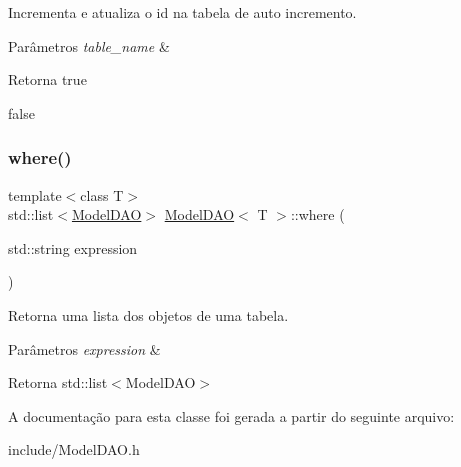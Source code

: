Incrementa e atualiza o id na tabela de auto incremento. 


\begin{DoxyParams}{Parâmetros}
{\em table\+\_\+name} & \\
\hline
\end{DoxyParams}
\begin{DoxyReturn}{Retorna}
true 

false 
\end{DoxyReturn}
\mbox{\label{classModelDAO_a241c58f7a4fcdbd60ded4cc65a77befd}} 
\subsubsection{\texorpdfstring{where()}{where()}}
{\footnotesize\ttfamily template$<$class T$>$ \\
std\+::list$<$\hyperlink{classModelDAO}{Model\+D\+AO}$>$ \hyperlink{classModelDAO}{Model\+D\+AO}$<$ T $>$\+::where (\begin{DoxyParamCaption}\item[{std\+::string}]{expression }\end{DoxyParamCaption})}



Retorna uma lista dos objetos de uma tabela. 


\begin{DoxyParams}{Parâmetros}
{\em expression} & \\
\hline
\end{DoxyParams}
\begin{DoxyReturn}{Retorna}
std\+::list$<$\+Model\+D\+A\+O$>$ 
\end{DoxyReturn}


A documentação para esta classe foi gerada a partir do seguinte arquivo\+:\begin{DoxyCompactItemize}
\item 
include/Model\+D\+A\+O.\+h\end{DoxyCompactItemize}
